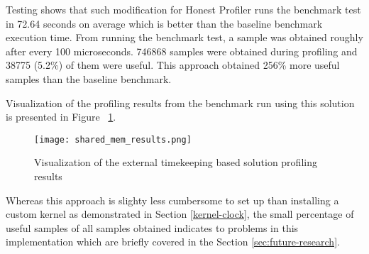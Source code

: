 \documentclass[..thesis.tex]{subfiles}
\begin{document}
Testing shows that such modification for Honest Profiler runs the benchmark test in 72.64 seconds on average which is better than the baseline benchmark execution time.  From running the benchmark test, a sample was obtained roughly after every 100 microseconds. 746868 samples were obtained during profiling and 38775 (5.2\%) of them were useful. This approach obtained 256\% more useful samples than the baseline benchmark.

Visualization of the profiling results from the benchmark run using this solution is presented in Figure ~\ref{fig:shared-mem-results}.
\begin{figure}[H]
\texttt{[image: shared\_mem\_results.png]}
\caption{Visualization of the external timekeeping based solution profiling results}
\label{fig:shared-mem-results}
\end{figure} 

Whereas this approach is slighty less cumbersome to set up than installing a custom kernel as demonstrated in Section \ref{kernel-clock}, the small percentage of useful samples of all samples obtained indicates to problems in this implementation which are briefly covered in the Section \ref{sec:future-research}.

\end{document}
